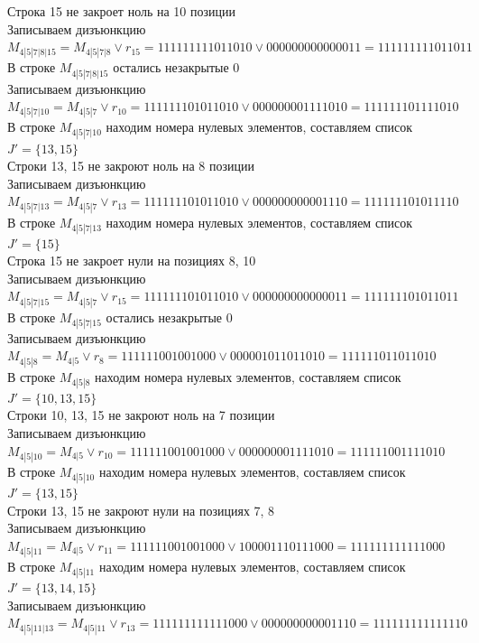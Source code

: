 \documentclass[12pt,a4paper]{report}
\begin{document}
Строка 15 не закроет ноль на 10 позиции \\
Записываем дизъюнкцию $M_{4 | 5 | 7 | 8 | 15} = M_{4 | 5 | 7 | 8}\vee r_{15} = 111111111011010 \vee 000000000000011 = 111111111011011$ \\
В строке $M_{4 | 5 | 7 | 8 | 15}$ остались незакрытые $0$ \\
Записываем дизъюнкцию $M_{4 | 5 | 7 | 10} = M_{4 | 5 | 7}\vee r_{10} = 111111101011010 \vee 000000001111010 = 111111101111010$ \\
В строке $M_{4 | 5 | 7 | 10}$ находим номера нулевых элементов, составляем список $J' = \{13, 15\}$ \\
Строки 13, 15 не закроют ноль на 8 позиции \\
Записываем дизъюнкцию $M_{4 | 5 | 7 | 13} = M_{4 | 5 | 7}\vee r_{13} = 111111101011010 \vee 000000000001110 = 111111101011110$ \\
В строке $M_{4 | 5 | 7 | 13}$ находим номера нулевых элементов, составляем список $J' = \{15\}$ \\
Строка 15 не закроет нули на позициях 8, 10 \\
Записываем дизъюнкцию $M_{4 | 5 | 7 | 15} = M_{4 | 5 | 7}\vee r_{15} = 111111101011010 \vee 000000000000011 = 111111101011011$ \\
В строке $M_{4 | 5 | 7 | 15}$ остались незакрытые $0$ \\
Записываем дизъюнкцию $M_{4 | 5 | 8} = M_{4 | 5}\vee r_{8} = 111111001001000 \vee 000001011011010 = 111111011011010$ \\
В строке $M_{4 | 5 | 8}$ находим номера нулевых элементов, составляем список $J' = \{10, 13, 15\}$ \\
Строки 10, 13, 15 не закроют ноль на 7 позиции \\
Записываем дизъюнкцию $M_{4 | 5 | 10} = M_{4 | 5}\vee r_{10} = 111111001001000 \vee 000000001111010 = 111111001111010$ \\
В строке $M_{4 | 5 | 10}$ находим номера нулевых элементов, составляем список $J' = \{13, 15\}$ \\
Строки 13, 15 не закроют нули на позициях 7, 8 \\
Записываем дизъюнкцию $M_{4 | 5 | 11} = M_{4 | 5}\vee r_{11} = 111111001001000 \vee 100001110111000 = 111111111111000$ \\
В строке $M_{4 | 5 | 11}$ находим номера нулевых элементов, составляем список $J' = \{13, 14, 15\}$ \\
Записываем дизъюнкцию $M_{4 | 5 | 11 | 13} = M_{4 | 5 | 11}\vee r_{13} = 111111111111000 \vee 000000000001110 = 111111111111110$ \\
\end{document}
